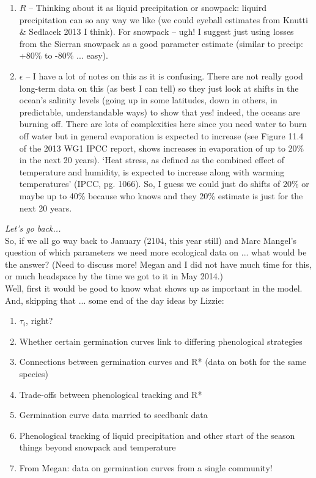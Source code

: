 \documentclass[11pt,a4paper,oneside]{article}
\begin{document}
\begin{enumerate}
\begin{enumerate}
\item \(R\) -- Thinking about it as liquid precipitation or snowpack: liquird precipitation can so any way we like (we could eyeball estimates from Knutti \& Sedlacek 2013 I think). For snowpack -- ugh! I suggest just using losses from the Sierran snowpack as a good parameter estimate (similar to precip: +80\% to -80\% ... easy).
\item \(\epsilon\) -- I have a lot of notes on this as it is confusing. There are not really good long-term data on this (as best I can tell) so they just look at shifts in the ocean's salinity levels (going up in some latitudes, down in others, in predictable, understandable ways) to show that yes! indeed, the oceans are burning off. There are lots of complexities here since you need water to burn off water but in general evaporation is expected to increase (see Figure 11.4 of the 2013 WG1 IPCC report, shows increases in evaporation of up to 20\% in the next 20 years). `Heat stress, as defined as the combined effect of temperature and humidity, is expected to increase along with warming temperatures' (IPCC, pg. 1066). So, I guess we could just do shifts of 20\% or maybe up to 40\% because who knows and they 20\% estimate is just for the next 20 years.
\end{enumerate}
\end{enumerate}

\noindent \emph{Let's go back...}\\

\noindent So, if we all go way back to January (2104, this year still) and Marc Mangel's question of which parameters we need more ecological data on ... what would be the answer? (Need to discuss more! Megan and I did not have much time for this, or much headspace by the time we got to it in May 2014.)\\

\noindent Well, first it would be good to know what shows up as important in the model. And, skipping that ... some end of the day ideas by Lizzie:

\begin{enumerate}
\item \(\tau_{i}\), right?
\item Whether certain germination curves link to differing phenological strategies
\item Connections between germination curves and R* (data on both for the same species)
\item Trade-offs between phenological tracking and R*
\item Germination curve data married to seedbank data
\item Phenological tracking of liquid precipitation and other start of the season things beyond snowpack and temperature
\item From Megan: data on germination curves from a single community!
\end{enumerate}

%
%
\end{document}
